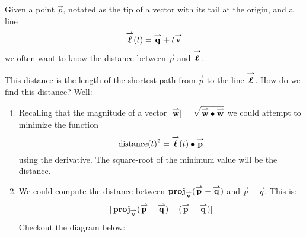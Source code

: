 \documentclass{ximera}
\begin{document}
Given a point $\vec{p}$, notated as the tip of a vector with its tail
at the origin, and a line
\[
\vecl(t) = \vec{q} + t\vec{v}
\]
we often want to know the distance between $\vec{p}$ and $\vecl$.
\begin{image}
\end{image}
This distance is the length of the shortest path from $\vec{p}$ to the
line $\vecl$. How do we find this distance? Well:
\begin{enumerate}
  \item Recalling that the magnitude of a vector $|\vec{w}|
    =\sqrt{\vec{w}\dotp\vec{w}}$ we could attempt to minimize the
    function
    \[
    \mathrm{distance}(t)^2= \vecl(t) \dotp \vec{p}
    \]
    using the derivative. The square-root of the minimum value will be
    the distance.
  \item We could compute the distance between
    $\proj_{\vec{v}}(\vec{p}-\vec{q})$ and $\vec{p}-\vec{q}$. This is:
    \[
    |\proj_{\vec{v}}(\vec{p}-\vec{q})- (\vec{p}-\vec{q})|
    \]
    Checkout the diagram below:
\end{enumerate}
\end{document}
